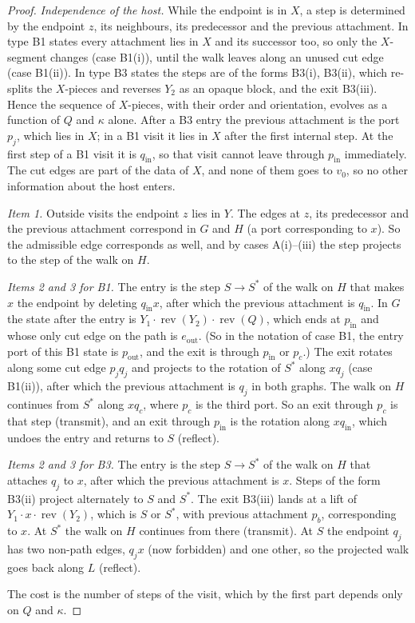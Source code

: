 \documentclass[11pt]{article}
\theoremstyle{definition}
\newcommand{\rev}{\operatorname{rev}}
\newcommand{\inn}{\mathrm{in}}
\begin{document}
\begin{proof}
\emph{Independence of the host.} While the endpoint is in $X$, a step is determined by the
endpoint $z$, its neighbours, its predecessor and the previous attachment. In type B1 states every
attachment lies in $X$ and its successor too, so only the $X$-segment changes (case B1(i)), until
the walk leaves along an unused cut edge (case B1(ii)). In type B3 states the steps are of the
forms B3(i), B3(ii), which re-splits the $X$-pieces and reverses $Y_2$ as an opaque block, and the
exit B3(iii). Hence the sequence of $X$-pieces, with their order and orientation, evolves as a
function of $Q$ and $\kappa$ alone. After a B3 entry the previous attachment is the port $p_j$,
which lies in $X$; in a B1 visit it lies in $X$ after the first internal step. At the first step
of a B1 visit it is $q_\inn$, so that visit cannot leave through $p_\inn$ immediately. The cut
edges are part of the data of $X$, and none of them goes to $v_0$, so no other information about
the host enters.

\emph{Item 1.} Outside visits the endpoint $z$ lies in $Y$. The edges at $z$, its predecessor and
the previous attachment correspond in $G$ and $H$ (a port corresponding to $x$). So the admissible
edge corresponds as well, and by cases A(i)--(iii) the step projects to the step of the walk on
$H$.

\emph{Items 2 and 3 for B1.} The entry is the step $S \to S^*$ of the walk on $H$ that makes $x$
the endpoint by deleting $q_\inn x$, after which the previous attachment is $q_\inn$. In $G$ the
state after the entry is $Y_1 \cdot \rev(Y_2) \cdot \rev(Q)$, which ends at $p_\inn$ and whose only
cut edge on the path is $e_{\mathrm{out}}$. (So in the notation of case B1, the entry port of this
B1 state is $p_{\mathrm{out}}$, and the exit is through $p_\inn$ or $p_c$.) The exit
rotates along some cut edge $p_jq_j$ and projects to the rotation of $S^*$ along $xq_j$ (case
B1(ii)), after which the previous attachment is $q_j$ in both graphs. The walk on $H$ continues
from $S^*$ along $xq_c$, where $p_c$ is the third port. So an exit through $p_c$ is that step
(transmit), and an exit through $p_\inn$ is the rotation along $xq_\inn$, which undoes the entry
and returns to $S$ (reflect).

\emph{Items 2 and 3 for B3.} The entry is the step $S \to S^*$ of the walk on $H$ that attaches
$q_j$ to $x$, after which the previous attachment is $x$. Steps of the form B3(ii) project
alternately to $S$ and $S^*$. The exit B3(iii) lands at a lift of $Y_1 \cdot x \cdot \rev(Y_2)$,
which is $S$ or $S^*$, with previous attachment $p_b$, corresponding to $x$. At $S^*$ the walk on
$H$ continues from there (transmit). At $S$ the endpoint $q_j$ has two non-path edges, $q_jx$
(now forbidden) and one other, so the projected walk goes back along $L$ (reflect).

The cost is the number of steps of the visit, which by the first part depends only on $Q$ and
$\kappa$.
\end{proof}
\end{document}
